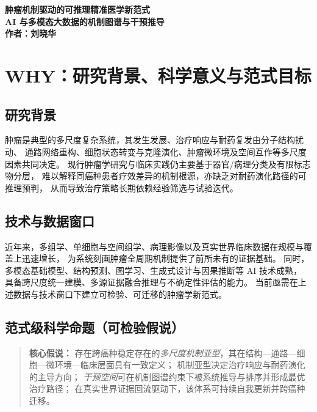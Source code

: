 \documentclass[12pt,a4paper,fontset=mac]{ctexart}
\begin{document}
\begin{center}
  {\LARGE \textbf{肿瘤机制驱动的可推理精准医学新范式}}\\[0.35em]
  {\Large \textbf{AI 与多模态大数据的机制图谱与干预推导}}\\[0.7em]
  {\large \textbf{作者：刘晓华}}\\[0.4em]

\end{center}

\vspace{0.8em}

\section{WHY：研究背景、科学意义与范式目标}

\subsection{研究背景}
肿瘤是典型的多尺度复杂系统，其发生发展、治疗响应与耐药复发由分子结构扰动、
通路网络重构、细胞状态转变与克隆演化、肿瘤微环境及空间互作等多尺度因素共同决定。
现行肿瘤学研究与临床实践仍主要基于器官/病理分类及有限标志物分层，
难以解释同癌种患者疗效差异的机制根源，亦缺乏对耐药演化路径的可推理预判，
从而导致治疗策略长期依赖经验筛选与试验迭代。

\subsection{技术与数据窗口}
近年来，多组学、单细胞与空间组学、病理影像以及真实世界临床数据在规模与覆盖上迅速增长，
为系统刻画肿瘤全周期机制提供了前所未有的证据基础。
同时，多模态基础模型、结构预测、图学习、生成式设计与因果推断等 AI 技术成熟，
具备跨尺度统一建模、多源证据融合推理与不确定性评估的能力。
当前亟需在上述数据与技术窗口下建立可检验、可迁移的肿瘤学新范式。

\subsection{范式级科学命题（可检验假说）}
\begin{quote}
\noindent
\textbf{核心假说：}
存在跨癌种稳定存在的\emph{多尺度机制亚型}，其在结构—通路—细胞—微环境—临床层面具有一致定义；
机制亚型决定治疗响应与耐药演化的主导方向；
\emph{干预空间}可在机制图谱约束下被系统推导与排序并形成最优治疗路径；
在真实世界证据回流驱动下，该体系可持续自我更新并跨癌种迁移。
\end{quote}
\end{document}
